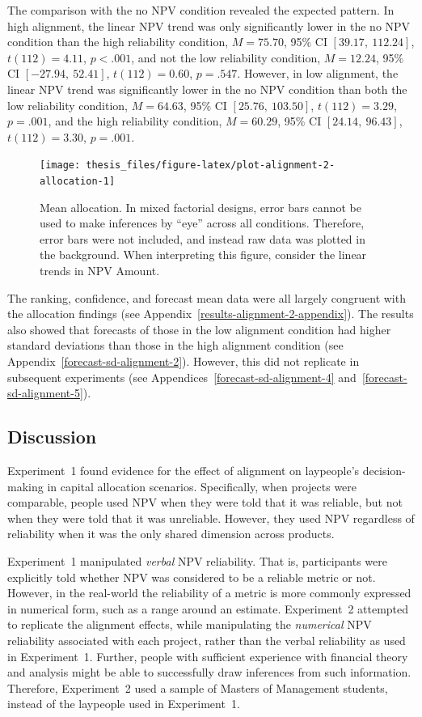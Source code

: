\documentclass[a4paper, nobind, dvipsnames]{templates/ociamthesis}
\theoremstyle{definition}
\theoremstyle{definition}
\theoremstyle{definition}
\theoremstyle{definition}
\theoremstyle{remark}
\begin{document}
The comparison with the no NPV condition revealed the expected pattern. In high
alignment, the linear NPV trend was only significantly lower in the no NPV
condition than the high reliability condition,
\(M = 75.70\), 95\% CI \([39.17,~112.24]\), \(t(112) = 4.11\), \(p < .001\), and not the low
reliability condition, \(M = 12.24\), 95\% CI \([-27.94,~52.41]\), \(t(112) = 0.60\), \(p = .547\).
However, in low alignment, the linear NPV trend was significantly lower in the
no NPV condition than both the low reliability condition,
\(M = 64.63\), 95\% CI \([25.76,~103.50]\), \(t(112) = 3.29\), \(p = .001\), and the high
reliability condition, \(M = 60.29\), 95\% CI \([24.14,~96.43]\), \(t(112) = 3.30\), \(p = .001\).



\begin{figure}
\texttt{[image: thesis\_files/figure-latex/plot-alignment-2-allocation-1]} \caption{Mean allocation. In mixed factorial designs, error bars cannot be used to make inferences by ``eye'' across all conditions. Therefore, error bars were not included, and instead raw data was plotted in the background. When interpreting this figure, consider the linear trends in NPV Amount.}\label{fig:plot-alignment-2-allocation}
\end{figure}

The ranking, confidence, and forecast mean data were all largely congruent with
the allocation findings (see Appendix~\ref{results-alignment-2-appendix}). The
results also showed that forecasts of those in the low alignment condition had
higher standard deviations than those in the high alignment condition (see
Appendix~\ref{forecast-sd-alignment-2}). However, this did not replicate in
subsequent experiments (see Appendices~\ref{forecast-sd-alignment-4}
and~\ref{forecast-sd-alignment-5}).

\subsection{Discussion}

Experiment~1 found evidence for the effect of alignment on laypeople's
decision-making in capital allocation scenarios. Specifically, when projects
were comparable, people used NPV when they were told that it was reliable, but
not when they were told that it was unreliable. However, they used NPV
regardless of reliability when it was the only shared dimension across products.

Experiment~1 manipulated \emph{verbal} NPV reliability. That is, participants were
explicitly told whether NPV was considered to be a reliable metric or not.
However, in the real-world the reliability of a metric is more commonly
expressed in numerical form, such as a range around an estimate. Experiment~2
attempted to replicate the alignment effects, while manipulating the \emph{numerical}
NPV reliability associated with each project, rather than the verbal reliability
as used in Experiment~1. Further, people with sufficient experience with
financial theory and analysis might be able to successfully draw inferences from
such information. Therefore, Experiment~2 used a sample of Masters of Management
students, instead of the laypeople used in Experiment~1.
\end{document}
